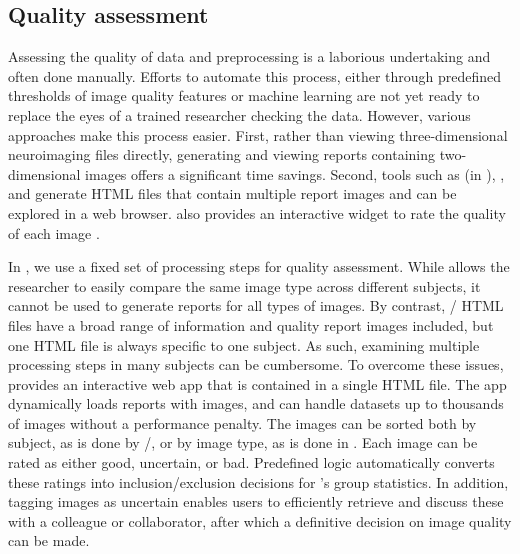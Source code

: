 \subsection{Quality assessment}\label{sec:qamethods}

Assessing the quality of data and preprocessing is a laborious undertaking
and often done manually. Efforts to automate this process, either through
predefined thresholds of image quality features
\parencite{10.1016/j.neuroimage.2017.10.034} or machine learning
\parencite{10.1371/journal.pone.0184661} are not yet ready to replace the eyes
of a trained researcher checking the data. However, various approaches make
this process easier. First, rather than viewing three-dimensional
neuroimaging files directly, generating and viewing reports containing
two-dimensional images offers a significant time savings. Second, tools
such as  (in ), , and 
generate HTML files that contain multiple report images and can be explored
in a web browser.  also provides an interactive widget to rate
the quality of each image \parencite{10.1038/s41597-019-0035-4}.

In , we use a fixed set of processing steps for quality
assessment. While  allows the researcher to easily compare
the same image type across different subjects, it cannot be used to
generate reports for all types of images. By contrast,
/ HTML files have a broad range of information
and quality report images included, but one HTML file is always specific to
one subject. As such, examining multiple processing steps in many subjects
can be cumbersome. To overcome these issues,  provides an
interactive web app that is contained in a single HTML file. The app
dynamically loads reports with images, and can handle datasets up to
thousands of images without a performance penalty. The images can be sorted
both by subject, as is done by /, or by image
type, as is done in . Each image can be rated as either
good, uncertain, or bad. Predefined logic automatically converts these
ratings into inclusion/exclusion decisions for 's group
statistics. In addition, tagging images as uncertain enables users to
efficiently retrieve and discuss these with a colleague or collaborator,
after which a definitive decision on image quality can be made.

